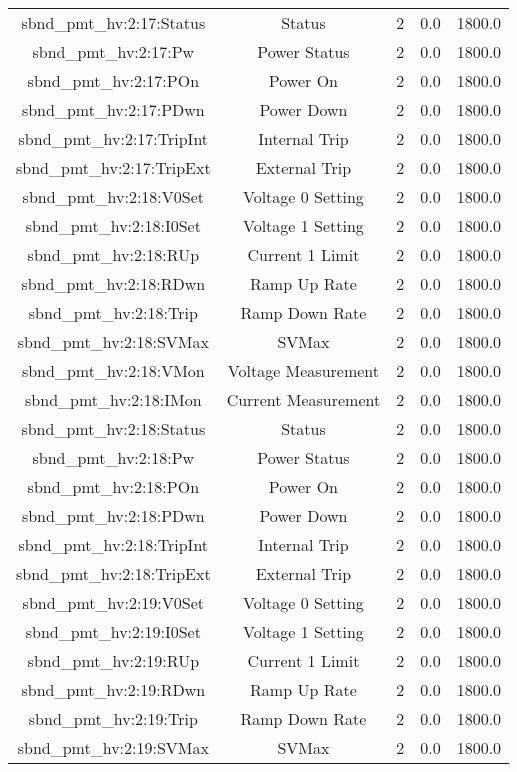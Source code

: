 \begin{center}
\begin{longtable}{c | c c c c }
sbnd\_pmt\_hv:2:17:Status & Status & 2 & 0.0 & 1800.0\\ 
sbnd\_pmt\_hv:2:17:Pw & Power Status & 2 & 0.0 & 1800.0\\ 
sbnd\_pmt\_hv:2:17:POn & Power On & 2 & 0.0 & 1800.0\\ 
sbnd\_pmt\_hv:2:17:PDwn & Power Down & 2 & 0.0 & 1800.0\\ 
sbnd\_pmt\_hv:2:17:TripInt & Internal Trip & 2 & 0.0 & 1800.0\\ 
sbnd\_pmt\_hv:2:17:TripExt & External Trip & 2 & 0.0 & 1800.0\\ 
sbnd\_pmt\_hv:2:18:V0Set & Voltage 0 Setting & 2 & 0.0 & 1800.0\\ 
sbnd\_pmt\_hv:2:18:I0Set & Voltage 1 Setting & 2 & 0.0 & 1800.0\\ 
sbnd\_pmt\_hv:2:18:RUp & Current 1 Limit & 2 & 0.0 & 1800.0\\ 
sbnd\_pmt\_hv:2:18:RDwn & Ramp Up Rate & 2 & 0.0 & 1800.0\\ 
sbnd\_pmt\_hv:2:18:Trip & Ramp Down Rate & 2 & 0.0 & 1800.0\\ 
sbnd\_pmt\_hv:2:18:SVMax & SVMax & 2 & 0.0 & 1800.0\\ 
sbnd\_pmt\_hv:2:18:VMon & Voltage Measurement & 2 & 0.0 & 1800.0\\ 
sbnd\_pmt\_hv:2:18:IMon & Current Measurement & 2 & 0.0 & 1800.0\\ 
sbnd\_pmt\_hv:2:18:Status & Status & 2 & 0.0 & 1800.0\\ 
sbnd\_pmt\_hv:2:18:Pw & Power Status & 2 & 0.0 & 1800.0\\ 
sbnd\_pmt\_hv:2:18:POn & Power On & 2 & 0.0 & 1800.0\\ 
sbnd\_pmt\_hv:2:18:PDwn & Power Down & 2 & 0.0 & 1800.0\\ 
sbnd\_pmt\_hv:2:18:TripInt & Internal Trip & 2 & 0.0 & 1800.0\\ 
sbnd\_pmt\_hv:2:18:TripExt & External Trip & 2 & 0.0 & 1800.0\\ 
sbnd\_pmt\_hv:2:19:V0Set & Voltage 0 Setting & 2 & 0.0 & 1800.0\\ 
sbnd\_pmt\_hv:2:19:I0Set & Voltage 1 Setting & 2 & 0.0 & 1800.0\\ 
sbnd\_pmt\_hv:2:19:RUp & Current 1 Limit & 2 & 0.0 & 1800.0\\ 
sbnd\_pmt\_hv:2:19:RDwn & Ramp Up Rate & 2 & 0.0 & 1800.0\\ 
sbnd\_pmt\_hv:2:19:Trip & Ramp Down Rate & 2 & 0.0 & 1800.0\\ 
sbnd\_pmt\_hv:2:19:SVMax & SVMax & 2 & 0.0 & 1800.0\\ 

\end{longtable}
\end{center}

